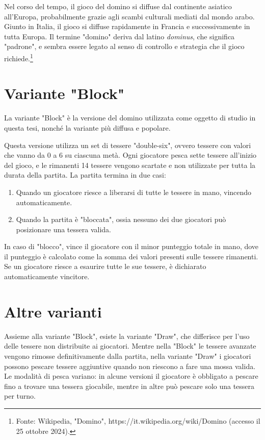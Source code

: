 \documentclass[a4paper,12pt]{report} %
\begin{document}
Nel corso del tempo, il gioco del domino si diffuse dal continente asiatico all'Europa, probabilmente grazie agli scambi culturali mediati dal mondo arabo. Giunto in Italia, il gioco si diffuse rapidamente in Francia e successivamente in tutta Europa. Il termine "domino" deriva dal latino \textit{dominus}, che significa "padrone", e sembra essere legato al senso di controllo e strategia che il gioco richiede.\footnote{Fonte: Wikipedia, "Domino", https://it.wikipedia.org/wiki/Domino (accesso il 25 ottobre 2024).}

\section{Variante "Block"}

La variante "Block" è la versione del domino utilizzata come oggetto di studio in questa tesi, nonché la variante più diffusa e popolare.

Questa versione utilizza un set di tessere "double-six", ovvero tessere con valori che vanno da 0 a 6 su ciascuna metà. Ogni giocatore pesca sette tessere all'inizio del gioco, e le rimanenti 14 tessere vengono scartate e non utilizzate per tutta la durata della partita. La partita termina in due casi:

\begin{enumerate}
    \item Quando un giocatore riesce a liberarsi di tutte le tessere in mano, vincendo automaticamente.
    \item Quando la partita è "bloccata", ossia nessuno dei due giocatori può posizionare una tessera valida.
\end{enumerate}

In caso di "blocco", vince il giocatore con il minor punteggio totale in mano, dove il punteggio è calcolato come la somma dei valori presenti sulle tessere rimanenti. Se un giocatore riesce a esaurire tutte le sue tessere, è dichiarato automaticamente vincitore.


\section{Altre varianti}

Assieme alla variante "Block", esiste la variante "Draw", che differisce per l'uso delle tessere non distribuite ai giocatori. Mentre nella "Block" le tessere avanzate vengono rimosse definitivamente dalla partita, nella variante "Draw" i giocatori possono pescare tessere aggiuntive quando non riescono a fare una mossa valida. Le modalità di pesca variano: in alcune versioni il giocatore è obbligato a pescare fino a trovare una tessera giocabile, mentre in altre può pescare solo una tessera per turno.
\end{document}
